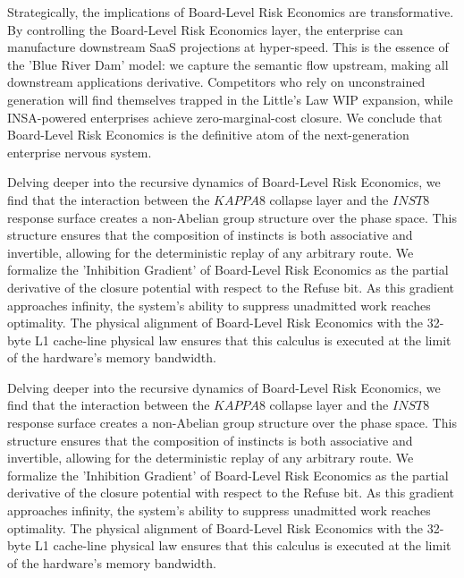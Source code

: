\documentclass[12pt,a4paper,oneside]{book}
\begin{document}
Strategically, the implications of Board-Level Risk Economics are transformative. By controlling the Board-Level Risk Economics layer, the enterprise can manufacture downstream SaaS projections at hyper-speed. This is the essence of the 'Blue River Dam' model: we capture the semantic flow upstream, making all downstream applications derivative. Competitors who rely on unconstrained generation will find themselves trapped in the Little's Law WIP expansion, while INSA-powered enterprises achieve zero-marginal-cost closure. We conclude that Board-Level Risk Economics is the definitive atom of the next-generation enterprise nervous system. 

Delving deeper into the recursive dynamics of Board-Level Risk Economics, we find that the interaction between the $KAPPA8$ collapse layer and the $INST8$ response surface creates a non-Abelian group structure over the phase space. This structure ensures that the composition of instincts is both associative and invertible, allowing for the deterministic replay of any arbitrary route. We formalize the 'Inhibition Gradient' of Board-Level Risk Economics as the partial derivative of the closure potential with respect to the Refuse bit. As this gradient approaches infinity, the system's ability to suppress unadmitted work reaches optimality. The physical alignment of Board-Level Risk Economics with the 32-byte L1 cache-line physical law ensures that this calculus is executed at the limit of the hardware's memory bandwidth. 

Delving deeper into the recursive dynamics of Board-Level Risk Economics, we find that the interaction between the $KAPPA8$ collapse layer and the $INST8$ response surface creates a non-Abelian group structure over the phase space. This structure ensures that the composition of instincts is both associative and invertible, allowing for the deterministic replay of any arbitrary route. We formalize the 'Inhibition Gradient' of Board-Level Risk Economics as the partial derivative of the closure potential with respect to the Refuse bit. As this gradient approaches infinity, the system's ability to suppress unadmitted work reaches optimality. The physical alignment of Board-Level Risk Economics with the 32-byte L1 cache-line physical law ensures that this calculus is executed at the limit of the hardware's memory bandwidth. 
\end{document}
